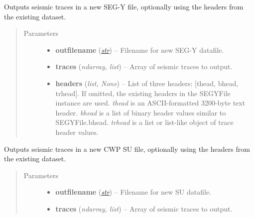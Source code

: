 \documentclass[letterpaper,10pt,english]{sphinxmanual}
\begin{document}
\begin{fulllineitems}
\begin{fulllineitems}
\label{segyread:pygeo.segyread.SEGYFile.writeSEGY}
Outputs seismic traces in a new SEG-Y file, optionally using the headers
from the existing dataset.
\begin{quote}\begin{description}
\item[{Parameters}] \leavevmode\begin{itemize}
\item {} 
\textbf{outfilename} (\href{http://docs.python.org/library/functions.html\#str}{\emph{str}}) -- Filename for new SEG-Y datafile.

\item {} 
\textbf{traces} (\emph{ndarray, list}) -- Array of seismic traces to output.

\item {} 
\textbf{headers} (\emph{list, None}) -- List of three headers: {[}thead, bhead, trhead{]}.  If omitted, the existing headers in the SEGYFile instance are used. \emph{thead} is an ASCII-formatted 3200-byte text header. \emph{bhead} is a list of binary header values similar to SEGYFile.bhead.  \emph{trhead} is a list or list-like object of trace header values.

\end{itemize}

\end{description}\end{quote}

\end{fulllineitems}


\begin{fulllineitems}
\label{segyread:pygeo.segyread.SEGYFile.writeSU}
Outputs seismic traces in a new CWP SU file, optionally using the headers
from the existing dataset.
\begin{quote}\begin{description}
\item[{Parameters}] \leavevmode\begin{itemize}
\item {} 
\textbf{outfilename} (\href{http://docs.python.org/library/functions.html\#str}{\emph{str}}) -- Filename for new SU datafile.

\item {} 
\textbf{traces} (\emph{ndarray, list}) -- Array of seismic traces to output.


\end{itemize}
\end{description}
\end{quote}
\end{fulllineitems}
\end{fulllineitems}
\end{document}
